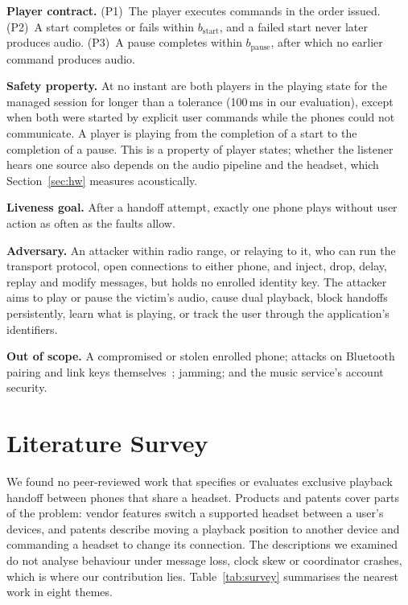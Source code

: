 \documentclass[conference]{IEEEtran}
\begin{document}
\textbf{Player contract.} (P1)~The player executes commands in the order issued. (P2)~A start completes or fails within $b_{\mathrm{start}}$, and a failed start never later produces audio. (P3)~A pause completes within $b_{\mathrm{pause}}$, after which no earlier command produces audio.

\textbf{Safety property.} At no instant are both players in the playing state for the managed session for longer than a tolerance (100\,ms in our evaluation), except when both were started by explicit user commands while the phones could not communicate. A player is playing from the completion of a start to the completion of a pause. This is a property of player states; whether the listener hears one source also depends on the audio pipeline and the headset, which Section~\ref{sec:hw} measures acoustically.

\textbf{Liveness goal.} After a handoff attempt, exactly one phone plays without user action as often as the faults allow.

\textbf{Adversary.} An attacker within radio range, or relaying to it, who can run the transport protocol, open connections to either phone, and inject, drop, delay, replay and modify messages, but holds no enrolled identity key. The attacker aims to play or pause the victim's audio, cause dual playback, block handoffs persistently, learn what is playing, or track the user through the application's identifiers.

\textbf{Out of scope.} A compromised or stolen enrolled phone; attacks on Bluetooth pairing and link keys themselves~\cite{bias2020,bluffs2023,blurtooth2020,happymitm2021,stealtooth2025}; jamming; and the music service's account security.

\section{Literature Survey}\label{sec:related}

We found no peer-reviewed work that specifies or evaluates exclusive playback handoff between phones that share a headset. Products and patents cover parts of the problem: vendor features switch a supported headset between a user's devices, and patents describe moving a playback position to another device and commanding a headset to change its connection. The descriptions we examined do not analyse behaviour under message loss, clock skew or coordinator crashes, which is where our contribution lies. Table~\ref{tab:survey} summarises the nearest work in eight themes.
\end{document}

